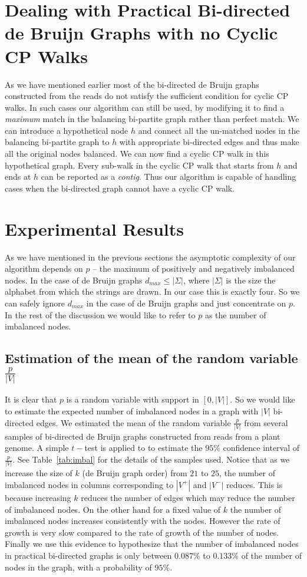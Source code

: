 \documentclass[runningheads]{llncs}
\begin{document}
\section{Dealing with Practical Bi-directed de Bruijn Graphs with no Cyclic CP Walks}
\label{sec:no-cpp}
As we have mentioned earlier most of the bi-directed de Bruijn graphs constructed from the
reads do not satisfy the sufficient condition for cyclic CP walks. In such cases our algorithm
can still be used, by modifying it to find a {\em maximum} match in the balancing bi-partite graph  
rather than perfect match. We can introduce a hypothetical node $h$ and connect all the 
un-matched nodes in the balancing bi-partite graph to $h$ with appropriate bi-directed edges and
thus make all the original nodes balanced. We can now find a cyclic CP walk in this hypothetical 
graph. Every sub-walk in the cyclic CP walk that starts from $h$ and ends at $h$ can be reported
as a {\em contig}. Thus our algorithm is capable of handling cases when the bi-directed graph cannot have a cyclic CP walk.

\section{Experimental Results}
\label{sec:exp}
As we have mentioned in the previous sections the asymptotic complexity of our algorithm depends on 
$p$ -- the maximum of positively and negatively imbalanced nodes. In the case of de Bruijn
graphs $d_{max}\leq |\Sigma|$, where $|\Sigma|$ is the size the alphabet from which the strings
are drawn. In our case this is exactly four. So we can safely ignore $d_{max}$ in the case of de Bruijn
graphs and just concentrate on $p$. In the rest of the discussion we would like to refer to $p$
as the number of imbalanced nodes.
\subsection{Estimation of the mean of the random variable $\frac{p}{|V|}$}
It is clear that $p$ is a random variable with support in $[0,|V|]$. So we would like to 
estimate the expected number of imbalanced nodes in a graph with $|V|$ bi-directed edges. We
estimated the mean of the random variable $\frac{p}{|V|}$ from several samples of bi-directed
de Bruijn graphs constructed from reads from a plant genome. A simple $t-$test is applied to 
to estimate the $95\%$ confidence interval of $\frac{p}{|V|}$. See Table~\ref{tab:imbal} for
the details of the samples used. Notice that as we increase the size of $k$ (de Bruijn graph
order) from $21$ to $25$, the number of imbalanced nodes in columns corresponding to $|V^+|$
and $|V^-|$ reduces. This is because increasing $k$ reduces the number of edges which may reduce
the number of imbalanced nodes. On the other hand for a fixed value of $k$ the number of
imbalanced nodes increases consistently with the nodes. However the rate of growth is very
slow compared to the rate of growth of the number of nodes. Finally we use this evidence to hypothesize
that the number of imbalanced nodes in practical bi-directed graphs is only between $0.087\%$
to $0.133\%$ of the number of nodes in the graph, with a probability of $95\%$.
\end{document}
